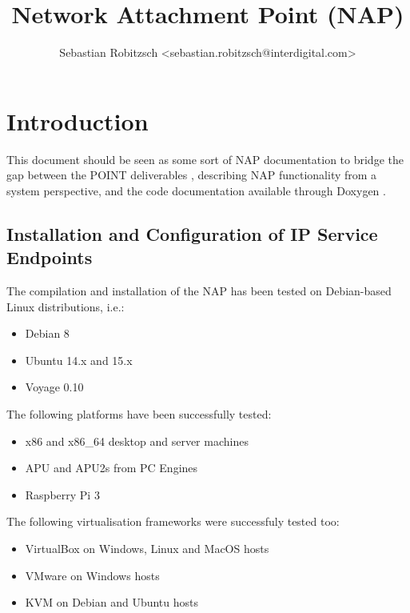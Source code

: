 \documentclass[a4paper,11pt,titlepage]{report}
\title{\textbf{Network Attachment Point (NAP)}}
\author{Sebastian Robitzsch <sebastian.robitzsch@interdigital.com>}
\begin{document}
\setcounter{secnumdepth}{3} %
\lstset{language=C++}   
\maketitle
\tableofcontents
\newpage

\acresetall
\chapter{Introduction}\label{ch:Introduction}
This document should be seen as some sort of \ac{NAP} documentation to bridge the gap between the POINT deliverables \cite{POINT}, describing \ac{NAP} functionality from a system perspective, and the code documentation available through Doxygen \cite{Heesch}. 
\section{Installation and Configuration of IP Service Endpoints}
The compilation and installation of the \ac{NAP} has been tested on Debian-based Linux distributions, i.e.:

\begin{itemize}
	\item Debian 8
	\item Ubuntu 14.x and 15.x
	\item Voyage 0.10
\end{itemize}

The following platforms have been successfully tested:
\begin{itemize}
	\item x86 and x86\_64 desktop and server machines
	\item APU and APU2s from PC Engines
	\item Raspberry Pi 3
\end{itemize}

The following virtualisation frameworks were successfuly tested too:
\begin{itemize}
	\item VirtualBox on Windows, Linux and MacOS hosts
	\item VMware on Windows hosts
	\item KVM on Debian and Ubuntu hosts
\end{itemize}
\end{document}
